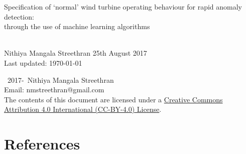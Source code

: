 \documentclass[twoside,12pt,openany]{book}
\def\theauthor{Nithiya Mangala Streethran}
\def\thetitle{%
  Specification of \texorpdfstring{`}{'}normal' wind turbine operating
  behaviour for rapid anomaly detection:\texorpdfstring{\\}{}
  through the use of machine learning algorithms%
}
\begin{document}

\frontmatter

\begin{titlepage}
  \hspace{0pt}\vfill %
  \centering %
  \Large\thetitle
  \\[4cm]
  \large\theauthor
  \vfill
  25th August 2017
  \\[.5cm]
  Last updated: \today
  \vfill\hspace{0pt} %
\end{titlepage}

\hspace{0pt}\vfill
\noindent\textcopyright~2017-\the\year{}~\theauthor \\[.5cm]
\noindent Email: nmstreethran@gmail.com \\[.5cm]
\noindent The contents of this document are licensed under a
\href{https://creativecommons.org/licenses/by/4.0/}%
{Creative Commons Attribution 4.0 International (CC-BY-4.0) License}.
\vfill\hspace{0pt}

\onehalfspacing


\contentlists

\themainmatter







{%
  \backmatter%
  \chapter{References}%
  \printbibliography[heading=none]%
}

\theappendix


\end{document}
